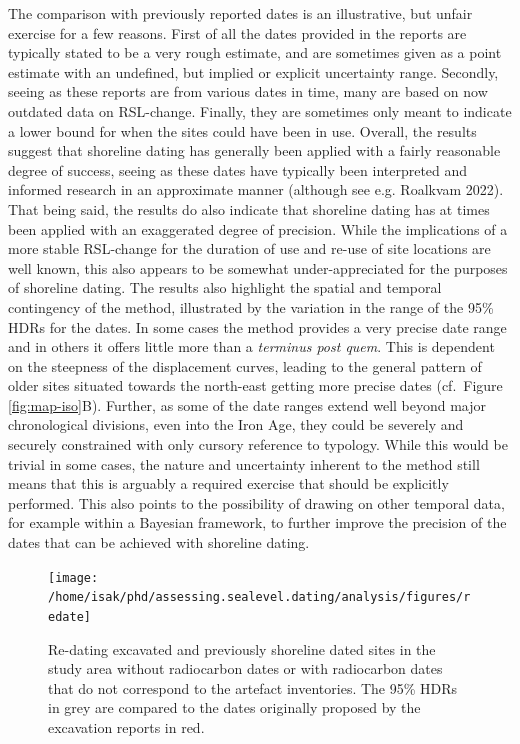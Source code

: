 \documentclass[
]{article}
\begin{document}
The comparison with previously reported dates is an illustrative, but unfair exercise for a few reasons. First of all the dates provided in the reports are typically stated to be a very rough estimate, and are sometimes given as a point estimate with an undefined, but implied or explicit uncertainty range. Secondly, seeing as these reports are from various dates in time, many are based on now outdated data on RSL-change. Finally, they are sometimes only meant to indicate a lower bound for when the sites could have been in use. Overall, the results suggest that shoreline dating has generally been applied with a fairly reasonable degree of success, seeing as these dates have typically been interpreted and informed research in an approximate manner (although see e.g. Roalkvam 2022). That being said, the results do also indicate that shoreline dating has at times been applied with an exaggerated degree of precision. While the implications of a more stable RSL-change for the duration of use and re-use of site locations are well known, this also appears to be somewhat under-appreciated for the purposes of shoreline dating. The results also highlight the spatial and temporal contingency of the method, illustrated by the variation in the range of the 95\% HDRs for the dates. In some cases the method provides a very precise date range and in others it offers little more than a \emph{terminus post quem}. This is dependent on the steepness of the displacement curves, leading to the general pattern of older sites situated towards the north-east getting more precise dates (cf.~Figure \ref{fig:map-iso}B). Further, as some of the date ranges extend well beyond major chronological divisions, even into the Iron Age, they could be severely and securely constrained with only cursory reference to typology. While this would be trivial in some cases, the nature and uncertainty inherent to the method still means that this is arguably a required exercise that should be explicitly performed. This also points to the possibility of drawing on other temporal data, for example within a Bayesian framework, to further improve the precision of the dates that can be achieved with shoreline dating.

\begin{figure}

{\centering \texttt{[image: /home/isak/phd/assessing.sealevel.dating/analysis/figures/redate]} 

}

\caption{Re-dating excavated and previously shoreline dated sites in the study area without radiocarbon dates or with radiocarbon dates that do not correspond to the artefact inventories. The 95\% HDRs in grey are compared to the dates originally proposed by the excavation reports in red.}\label{fig:redate}
\end{figure}
\end{document}
